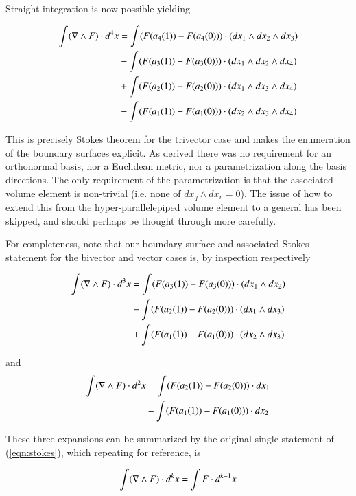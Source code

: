 Straight integration is now possible yielding

\begin{align*}
\int ( \nabla \wedge F ) \cdot d^4 x 
&= \int (F(a_4(1)) - F(a_4(0))) \cdot ( dx_1 \wedge dx_2 \wedge dx_3 ) \\
&- \int (F(a_3(1)) - F(a_3(0))) \cdot ( dx_1 \wedge dx_2 \wedge dx_4 ) \\
&+ \int (F(a_2(1)) - F(a_2(0))) \cdot ( dx_1 \wedge dx_3 \wedge dx_4 ) \\
&- \int (F(a_1(1)) - F(a_1(0))) \cdot ( dx_2 \wedge dx_3 \wedge dx_4 ) \\
\end{align*}

This is precisely Stokes theorem for the trivector case and makes the enumeration of the boundary surfaces explicit.  As derived there was no requirement for an orthonormal basis, nor a Euclidean metric, nor a parametrization along the basis directions.  The only requirement of the parametrization is that the associated volume element is non-trivial (i.e. none of $dx_q \wedge dx_r = 0$).  The issue of how to extend this from the hyper-parallelepiped volume element to a general has been skipped, and should perhaps be thought through more carefully.

For completeness, note that our boundary surface and associated Stokes statement for the bivector and vector cases is, by inspection respectively

\begin{align*}
\int ( \nabla \wedge F ) \cdot d^3 x 
&= \int (F(a_3(1)) - F(a_3(0))) \cdot ( dx_1 \wedge dx_2 ) \\
&- \int (F(a_2(1)) - F(a_2(0))) \cdot ( dx_1 \wedge dx_3 ) \\
&+ \int (F(a_1(1)) - F(a_1(0))) \cdot ( dx_2 \wedge dx_3 ) \\
\end{align*}

and
\begin{align*}
\int ( \nabla \wedge F ) \cdot d^2 x 
&= \int (F(a_2(1)) - F(a_2(0))) \cdot dx_1 \\
&- \int (F(a_1(1)) - F(a_1(0))) \cdot dx_2 \\
\end{align*}

These three expansions can be summarized by the original single statement of (\ref{eqn:stokes}), which repeating for reference, is

\begin{align*}
\int ( \nabla \wedge F ) \cdot d^k x = \int F \cdot d^{k-1} x 
\end{align*}

